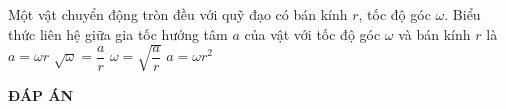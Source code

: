 \begin{ex}
	Một vật chuyển động tròn đều với quỹ đạo có bán kính $r$, tốc độ góc $\omega$. Biểu thức liên hệ giữa gia tốc hướng tâm $a$ của vật với tốc độ góc $\omega$ và bán kính $r$ là
	\choice
	{$a=\omega r$}
	{$\sqrt{\omega}=\dfrac{a}{r}$}
	{\True $\omega=\sqrt{\dfrac{a}{r}}$}
	{$a=\omega r^2$}
	\loigiai{}
\end{ex}




\newpage
\begin{center}
	\textbf{ĐÁP ÁN}
\end{center}
